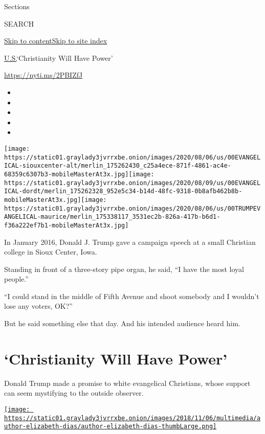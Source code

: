 Sections

SEARCH

\protect\hyperlink{site-content}{Skip to
content}\protect\hyperlink{site-index}{Skip to site index}

\href{/section/us}{U.S.}\textbar{}`Christianity Will Have Power'

\url{https://nyti.ms/2PBIZfJ}

\begin{itemize}
\item
\item
\item
\item
\item
\end{itemize}

\texttt{[image: https://static01.graylady3jvrrxbe.onion/images/2020/08/06/us/00EVANGELICAL-siouxcenter-alt/merlin\_175262430\_c25a4ece-871f-4861-ac4e-68359c6307b3-mobileMasterAt3x.jpg]}\texttt{[image: https://static01.graylady3jvrrxbe.onion/images/2020/08/09/us/00EVANGELICAL-dordt/merlin\_175262328\_952e5c34-b14d-48fc-9318-0b8afb462b8b-mobileMasterAt3x.jpg]}\texttt{[image: https://static01.graylady3jvrrxbe.onion/images/2020/08/06/us/00TRUMPEVANGELICAL-maurice/merlin\_175338117\_3531ec2b-826a-417b-b6d1-f36a222ef7b1-mobileMasterAt3x.jpg]}

In January 2016, Donald J. Trump gave a campaign speech at a small
Christian college in Sioux Center, Iowa.

Standing in front of a three-story pipe organ, he said, ``I have the
most loyal people.''

``I could stand in the middle of Fifth Avenue and shoot somebody and I
wouldn't lose any voters, OK?''

But he said something else that day. And his intended audience heard
him.

\hypertarget{christianity-will-have-power}{%
\section{`Christianity Will Have
Power'}\label{christianity-will-have-power}}

Donald Trump made a promise to white evangelical Christians, whose
support can seem mystifying to the outside observer.

\href{https://www.nytimes3xbfgragh.onion/by/elizabeth-dias}{\texttt{[image: https://static01.graylady3jvrrxbe.onion/images/2018/11/06/multimedia/author-elizabeth-dias/author-elizabeth-dias-thumbLarge.png]}}

